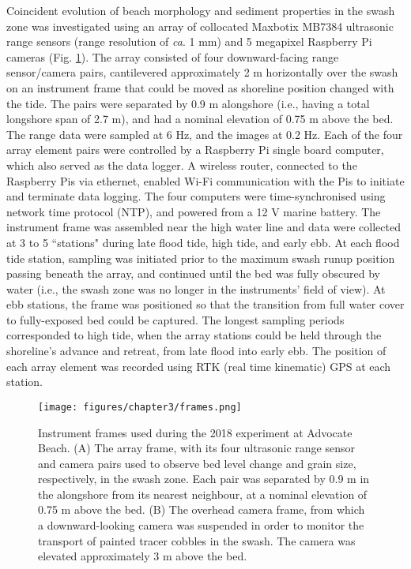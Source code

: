 Coincident evolution of beach morphology and sediment properties in the swash zone was investigated using an array of collocated Maxbotix MB7384 ultrasonic range sensors (range resolution of \textit{ca}. 1 mm) and 5 megapixel Raspberry Pi cameras (Fig. \ref{fig:frames}). The array consisted of four downward-facing range sensor/camera pairs, cantilevered approximately 2 m horizontally over the swash on an instrument frame that could be moved as shoreline position changed with the tide. The pairs were separated by 0.9 m alongshore (i.e., having a total longshore span of 2.7 m), and had a nominal elevation of 0.75 m above the bed. The range data were sampled at 6 Hz, and the images at 0.2 Hz. Each of the four array element pairs were controlled by a Raspberry Pi single board computer, which also served as the data logger. A wireless router, connected to the Raspberry Pis via ethernet, enabled Wi-Fi communication with the Pis to initiate and terminate data logging. The four computers were time-synchronised using network time protocol (NTP), and powered from a 12 V marine battery. The instrument frame was assembled near the high water line and data were collected at 3 to 5 ``stations" during late flood tide, high tide, and early ebb. At each flood tide station, sampling was initiated prior to the maximum swash runup position passing beneath the array, and continued until the bed was fully obscured by water (i.e., the swash zone was no longer in the instruments' field of view). At ebb stations, the frame was positioned so that the transition from full water cover to fully-exposed bed could be captured. The longest sampling periods corresponded to high tide, when the array stations could be held through the shoreline's advance and retreat, from late flood into early ebb. The position of each array element was recorded using RTK (real time kinematic) GPS at each station. 

\begin{figure}[tbp] %
	\texttt{[image: figures/chapter3/frames.png]}
 	\caption[Instrument frame photographs: Advocate 2018 experiment]{Instrument frames used during the 2018 experiment at Advocate Beach. (A) The array frame, with its four ultrasonic range sensor and camera pairs used to observe bed level change and grain size, respectively, in the swash zone. Each pair was separated by 0.9 m in the alongshore from its nearest neighbour, at a nominal elevation of 0.75 m above the bed. (B) The overhead camera frame, from which a downward-looking camera was suspended in order to monitor the transport of painted tracer cobbles in the swash. The camera was elevated approximately 3 m above the bed. \label{fig:frames}}
\end{figure}

